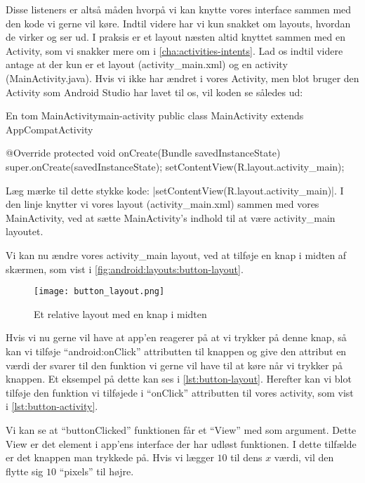 Disse listeners er altså måden hvorpå vi kan knytte vores \gls{interface} 
sammen med den kode vi gerne vil køre. Indtil videre har vi kun snakket om 
layouts, hvordan de virker og ser ud. I praksis er et layout næsten altid 
knyttet sammen med en Activity, som vi snakker mere om i 
\autoref{cha:activities-intents}. Lad os indtil videre antage at der kun er et 
layout (activity\_main.xml) og en activity (MainActivity.java). Hvis vi ikke 
har ændret i vores Activity, men blot bruger den Activity som Android Studio 
har lavet til os, vil koden se således ud:

\begin{JavaCode}{En tom MainActivity}{main-activity}
	public class MainActivity extends AppCompatActivity {
		
		@Override
		protected void onCreate(Bundle savedInstanceState) {
			super.onCreate(savedInstanceState);
			setContentView(R.layout.activity_main);
		}
	
	}
\end{JavaCode}

Læg mærke til dette stykke kode: 
\JavaInline|setContentView(R.layout.activity_main)|. I den linje knytter vi 
vores layout (activity\_main.xml) sammen med vores MainActivity, ved at sætte 
MainActivity's indhold til at være activity\_main layoutet.

Vi kan nu ændre vores activity\_main layout, ved at tilføje en knap i midten af 
skærmen, som vist i \autoref{fig:android:layouts:button-layout}.

\begin{figure}[h]
	\begin{center}
		\texttt{[image: button\_layout.png]}
		\caption{Et relative layout med en knap i midten}
		\label{fig:android:layouts:button-layout}
	\end{center}
\end{figure}

Hvis vi nu gerne vil have at app'en reagerer på at vi trykker på denne knap, så 
kan vi tilføje ``android:onClick'' attributten til knappen og give den attribut 
en værdi der svarer til den funktion vi gerne vil have til at køre når vi 
trykker på knappen. Et eksempel på dette kan ses i \autoref{lst:button-layout}.
Herefter kan vi blot tilføje den funktion vi tilføjede i ``onClick'' 
attributten til vores activity, som vist i \autoref{lst:button-activity}.

Vi kan se at ``buttonClicked'' funktionen får et ``View'' med som argument. 
Dette View er det element i app'ens \gls{interface} der har udløst funktionen. 
I dette tilfælde er det knappen man trykkede på. Hvis vi lægger $10$ til dens 
$x$ værdi, vil den flytte sig $10$ ``pixels'' til højre.

